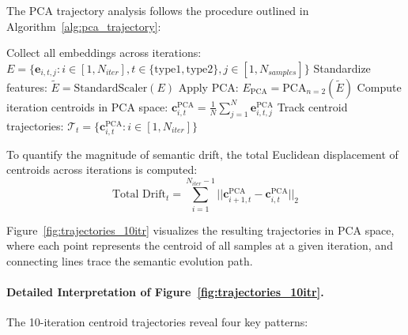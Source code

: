 The PCA trajectory analysis follows the procedure outlined in Algorithm~\ref{alg:pca_trajectory}:

\begin{algorithm}[H]
\caption{PCA Trajectory Analysis}
\label{alg:pca_trajectory}
\begin{algorithmic}[1]
\STATE Collect all embeddings across iterations: $E = \{\mathbf{e}_{i,t,j} : i \in [1,N_{iter}], t \in \{\text{type1}, \text{type2}\}, j \in [1,N_{samples}]\}$
\STATE Standardize features: $\tilde{E} = \text{StandardScaler}(E)$
\STATE Apply PCA: $E_{\text{PCA}} = \text{PCA}_{n=2}(\tilde{E})$
\STATE Compute iteration centroids in PCA space: $\mathbf{c}_{i,t}^{\text{PCA}} = \frac{1}{N} \sum_{j=1}^{N} \mathbf{e}_{i,t,j}^{\text{PCA}}$
\STATE Track centroid trajectories: $\mathcal{T}_t = \{\mathbf{c}_{i,t}^{\text{PCA}} : i \in [1,N_{iter}]\}$
\end{algorithmic}
\end{algorithm}

To quantify the magnitude of semantic drift, the total Euclidean displacement of centroids across iterations is computed:
\begin{equation}
\text{Total Drift}_t = \sum_{i=1}^{N_{iter}-1} ||\mathbf{c}_{i+1,t}^{\text{PCA}} - \mathbf{c}_{i,t}^{\text{PCA}}||_2
\end{equation}

Figure~\ref{fig:trajectories_10itr} visualizes the resulting trajectories in PCA space, where each point represents the centroid of all samples at a given iteration, and connecting lines trace the semantic evolution path.

\paragraph{Detailed Interpretation of Figure~\ref{fig:trajectories_10itr}.}
The 10-iteration centroid trajectories reveal four key patterns:


